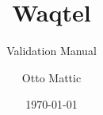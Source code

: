 \documentclass[Waqtel]{../../data/TelemacDoc} %
\begin{document}
\let\cleardoublepage\clearpage

\title{Waqtel}
\subtitle{Validation Manual}
\author{Otto Mattic}
\date{\today}
\maketitle
\clearpage



\newpage

\thispagestyle{empty}

\TelemacCopyright{}




\pagestyle{empty} %

\tableofcontents%


\pagestyle{fancy} %





\nocite{*}

\end{document}
